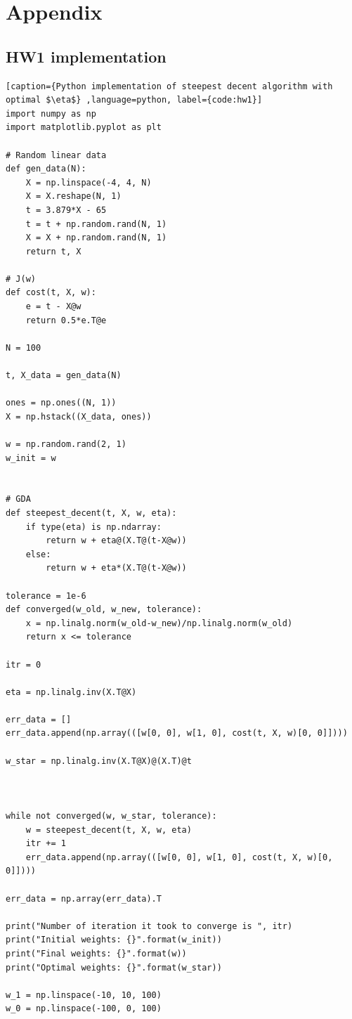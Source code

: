 \documentclass{article}
\begin{document}
\section*{\hfil Appendix}

\subsection*{HW1 implementation}
\begin{lstlisting}[caption={Python implementation of steepest decent algorithm with optimal $\eta$} ,language=python, label={code:hw1}] 
import numpy as np
import matplotlib.pyplot as plt

# Random linear data
def gen_data(N):
	X = np.linspace(-4, 4, N)
	X = X.reshape(N, 1)
	t = 3.879*X - 65
	t = t + np.random.rand(N, 1)
	X = X + np.random.rand(N, 1)
	return t, X

# J(w)
def cost(t, X, w):
	e = t - X@w
	return 0.5*e.T@e

N = 100

t, X_data = gen_data(N)

ones = np.ones((N, 1))
X = np.hstack((X_data, ones))

w = np.random.rand(2, 1)
w_init = w


# GDA
def steepest_decent(t, X, w, eta):
	if type(eta) is np.ndarray:
		return w + eta@(X.T@(t-X@w))
	else:
		return w + eta*(X.T@(t-X@w))

tolerance = 1e-6
def converged(w_old, w_new, tolerance):
	x = np.linalg.norm(w_old-w_new)/np.linalg.norm(w_old)
	return x <= tolerance

itr = 0

eta = np.linalg.inv(X.T@X)

err_data = []
err_data.append(np.array(([w[0, 0], w[1, 0], cost(t, X, w)[0, 0]])))

w_star = np.linalg.inv(X.T@X)@(X.T)@t



while not converged(w, w_star, tolerance):
	w = steepest_decent(t, X, w, eta)
	itr += 1
	err_data.append(np.array(([w[0, 0], w[1, 0], cost(t, X, w)[0, 0]])))

err_data = np.array(err_data).T

print("Number of iteration it took to converge is ", itr)
print("Initial weights: {}".format(w_init))
print("Final weights: {}".format(w))
print("Optimal weights: {}".format(w_star))

w_1 = np.linspace(-10, 10, 100)
w_0 = np.linspace(-100, 0, 100)


\end{lstlisting}
\end{document}
